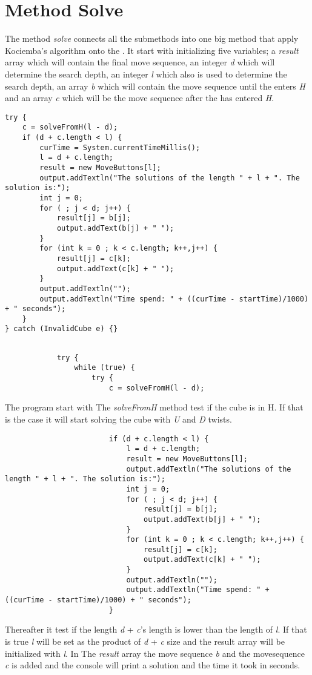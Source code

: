\section{Method Solve}


The method \textit{solve} connects all the submethods into one big method that apply Kociemba's algorithm onto the \rubik{}. 
It start with initializing five variables; 
a \textit{result} array which will contain the final move sequence, an integer \textit{d} which will determine the search depth, 
an integer \textit{l} which also is used to determine the search depth, 
an array \textit{b} which will contain the move sequence until the \rubik{} enters \textit{H} 
and an array \textit{c} which will be the move sequence after the \rubik{} has entered \textit{H}.

\begin{lstlisting}[style=sourceCode, caption=\myCaption{Key point in the code to kociemba's optimal solver}, label=src:kociemba]
try {
	c = solveFromH(l - d);
	if (d + c.length < l) {
		curTime = System.currentTimeMillis();
		l = d + c.length;
		result = new MoveButtons[l];
		output.addTextln("The solutions of the length " + l + ". The solution is:");
		int j = 0;
		for ( ; j < d; j++) {
			result[j] = b[j];
			output.addText(b[j] + " ");
		}
		for (int k = 0 ; k < c.length; k++,j++) {
			result[j] = c[k];
			output.addText(c[k] + " ");
		}
		output.addTextln("");
		output.addTextln("Time spend: " + ((curTime - startTime)/1000) + " seconds");
	}
} catch (InvalidCube e) {}
\end{lstlisting}

\begin{verbatim}
			
			try {
				while (true) {
					try {
						c = solveFromH(l - d);
\end{verbatim}
The program start with The \textit{solveFromH} method test if the cube is in H. If that is the case it will start solving the cube with \textit{U} and \textit{D} twists.

\begin{verbatim}
						if (d + c.length < l) {
							l = d + c.length;
							result = new MoveButtons[l];
							output.addTextln("The solutions of the length " + l + ". The solution is:");
							int j = 0;
							for ( ; j < d; j++) {
								result[j] = b[j];
								output.addText(b[j] + " ");
							}
							for (int k = 0 ; k < c.length; k++,j++) {
								result[j] = c[k];
								output.addText(c[k] + " ");
							}
							output.addTextln("");
							output.addTextln("Time spend: " + ((curTime - startTime)/1000) + " seconds");
						}
\end{verbatim}
Thereafter it test if the length \textit{d} + \textit{c}'s length is lower than the length of \textit{l}. 
If that is true \textit{l} will be set as the product of \textit{d} + \textit{c} size and the result array will be initialized with \textit{l}. 
In The \textit{result} array the move sequence \textit{b} and the movesequence \textit{c} is added and the console will print a solution and the time it took in seconds.


